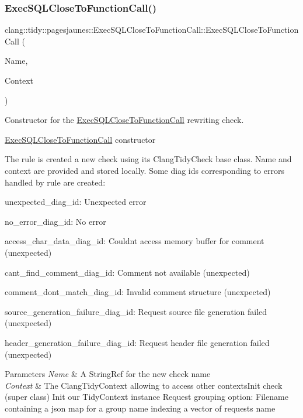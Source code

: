 \subsubsection{\texorpdfstring{Exec\+S\+Q\+L\+Close\+To\+Function\+Call()}{ExecSQLCloseToFunctionCall()}}
{\footnotesize\ttfamily clang\+::tidy\+::pagesjaunes\+::\+Exec\+S\+Q\+L\+Close\+To\+Function\+Call\+::\+Exec\+S\+Q\+L\+Close\+To\+Function\+Call (\begin{DoxyParamCaption}\item[{String\+Ref}]{Name,  }\item[{Clang\+Tidy\+Context $\ast$}]{Context }\end{DoxyParamCaption})}



Constructor for the \hyperlink{classclang_1_1tidy_1_1pagesjaunes_1_1_exec_s_q_l_close_to_function_call}{Exec\+S\+Q\+L\+Close\+To\+Function\+Call} rewriting check. 

\hyperlink{classclang_1_1tidy_1_1pagesjaunes_1_1_exec_s_q_l_close_to_function_call}{Exec\+S\+Q\+L\+Close\+To\+Function\+Call} constructor

The rule is created a new check using its {\ttfamily Clang\+Tidy\+Check} base class. Name and context are provided and stored locally. Some diag ids corresponding to errors handled by rule are created\+:
\begin{DoxyItemize}
\item unexpected\+\_\+diag\+\_\+id\+: Unexpected error
\item no\+\_\+error\+\_\+diag\+\_\+id\+: No error
\item access\+\_\+char\+\_\+data\+\_\+diag\+\_\+id\+: Couldn\textquotesingle{}t access memory buffer for comment (unexpected)
\item cant\+\_\+find\+\_\+comment\+\_\+diag\+\_\+id\+: Comment not available (unexpected)
\item comment\+\_\+dont\+\_\+match\+\_\+diag\+\_\+id\+: Invalid comment structure (unexpected)
\item source\+\_\+generation\+\_\+failure\+\_\+diag\+\_\+id\+: Request source file generation failed (unexpected)
\item header\+\_\+generation\+\_\+failure\+\_\+diag\+\_\+id\+: Request header file generation failed (unexpected)
\end{DoxyItemize}


\begin{DoxyParams}{Parameters}
{\em Name} & A String\+Ref for the new check name \\
\hline
{\em Context} & The Clang\+Tidy\+Context allowing to access other contexts\+Init check (super class) Init our Tidy\+Context instance Request grouping option\+: Filename containing a json map for a group name indexing a vector of requests name \\
\hline
\end{DoxyParams}


